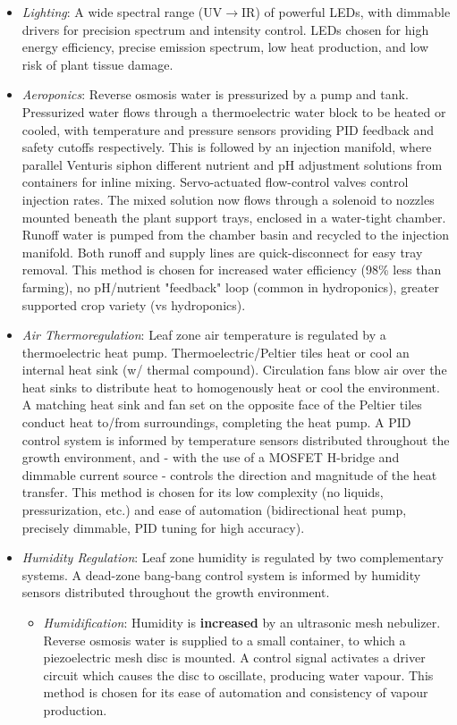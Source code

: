 \documentclass{report}
\begin{document}
\begin{itemize}
    \item\textit{Lighting}: A wide spectral range (UV$\to$IR) of powerful LEDs, with dimmable drivers for precision spectrum and intensity control. LEDs chosen for high energy efficiency, precise emission spectrum, low heat production, and low risk of plant tissue damage.
    \item \textit{Aeroponics}: Reverse osmosis water is pressurized by a pump and tank. Pressurized water flows through a thermoelectric water block to be heated or cooled, with temperature and pressure sensors providing PID feedback and safety cutoffs respectively. This is followed by an injection manifold, where parallel Venturis siphon different nutrient and pH adjustment solutions from containers for inline mixing. Servo-actuated flow-control valves control injection rates. The mixed solution now flows through a solenoid to nozzles mounted beneath the plant support trays, enclosed in a water-tight chamber. Runoff water is pumped from the chamber basin and recycled to the injection manifold. Both runoff and supply lines are quick-disconnect for easy tray removal. This method is chosen for increased water efficiency (98\% less than farming), no pH/nutrient "feedback" loop (common in hydroponics), greater supported crop variety (vs hydroponics).
    \item \textit{Air Thermoregulation}: Leaf zone air temperature is regulated by a thermoelectric heat pump. Thermoelectric/Peltier tiles heat or cool an internal heat sink (w/ thermal compound). Circulation fans blow air over the heat sinks to distribute heat to homogenously heat or cool the environment. A matching heat sink and fan set on the opposite face of the Peltier tiles conduct heat to/from surroundings, completing the heat pump. A PID control system is informed by temperature sensors distributed throughout the growth environment, and - with the use of a MOSFET H-bridge and dimmable current source - controls the direction and magnitude of the heat transfer. This method is chosen for its low complexity (no liquids, pressurization, etc.) and ease of automation (bidirectional heat pump, precisely dimmable, PID tuning for high accuracy).
    \item \textit{Humidity Regulation}: Leaf zone humidity is regulated by two complementary systems. A dead-zone bang-bang control system is informed by humidity sensors distributed throughout the growth environment.
    \begin{itemize}
        \item \textit{Humidification}: Humidity is \textbf{increased} by an ultrasonic mesh nebulizer. Reverse osmosis water is supplied to a small container, to which a piezoelectric mesh disc is mounted. A control signal activates a driver circuit which causes the disc to oscillate, producing water vapour. This method is chosen for its ease of automation and consistency of vapour production.

\end{itemize}
\end{itemize}
\end{document}
